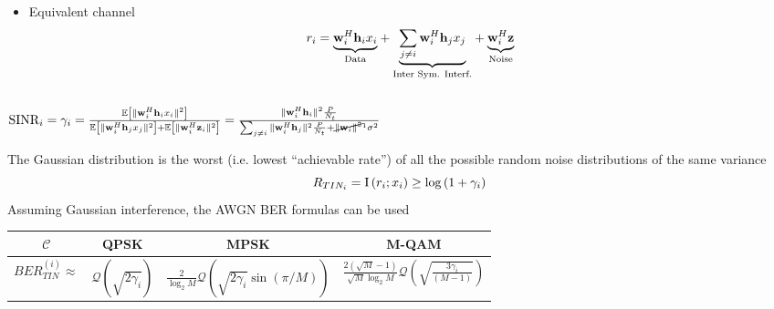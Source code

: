 \documentclass[xcolor=dvipsnames,aspectratio=169]{beamer}
\begin{document}
{\begin{columns}
\begin{column}{6cm}
\begin{itemize}
    \item Equivalent channel
    $$r_i=\underset{\textnormal{Data}}{\underbrace{\mathbf{w}_i^H\mathbf{h}_i x_i}} +\underset{\textnormal{Inter Sym. Interf.}}{\underbrace{\sum_{j\neq i}\mathbf{w}_i^H\mathbf{h}_j x_j}} +\underset{\textnormal{Noise}}{\underbrace{\mathbf{w}_i^H\mathbf{z}}}$$
     \end{itemize}
 \end{column}
\end{columns} 
\begin{definition}
 $ \textnormal{SINR}_i=\gamma_i=\frac{{\mathbb{E}_{}\left[ \|\mathbf{w}_i^H\mathbf{h}_i x_i\|^2\right]}}{{\mathbb{E}_{}\left[ \|\mathbf{w}_i^H\mathbf{h}_j x_j\|^2\right]}+{\mathbb{E}_{}\left[ \|\mathbf{w}_i^H\mathbf{z}_i\|^2\right]}}=\frac{\|\mathbf{w}_i^H\mathbf{h}_i\|^2\frac{P}{N_t}}{\sum_{j\neq i}\|\mathbf{w}_i^H\mathbf{h}_j\|^2\frac{P}{N_t}+\cancel{\|\mathbf{w}_i\|^2}^{1}\sigma^2}$
\end{definition}
\begin{theorem}
 The Gaussian distribution is the worst (i.e. lowest ``achievable rate'') of all the possible random noise distributions of the same variance
 $$R_{TIN_i}={\textnormal{I}\left(r_i;x_i\right)}\geq \log\left(1+\gamma_i\right)$$
 Assuming Gaussian interference, the AWGN BER formulas can be used
 \begin{table}
 \begin{tabular}{c|ccc}
  $\mathcal{C}$& QPSK & MPSK & M-QAM\\\hline
  $BER_{TIN}^{(i)}\approx$ & $\mathcal{Q}(\sqrt{2\gamma_i})$ & $\frac{2}{\log_2 M}\mathcal{Q}(\sqrt{2\gamma_i}\sin(\pi/M))$& $\frac{2(\sqrt{M}-1)}{\sqrt{M}\log_2 M}\mathcal{Q}(\sqrt{\frac{3\gamma_i}{(M-1)}})$ \\
 \end{tabular}
 \end{table}
\end{theorem}

}
\end{document}
